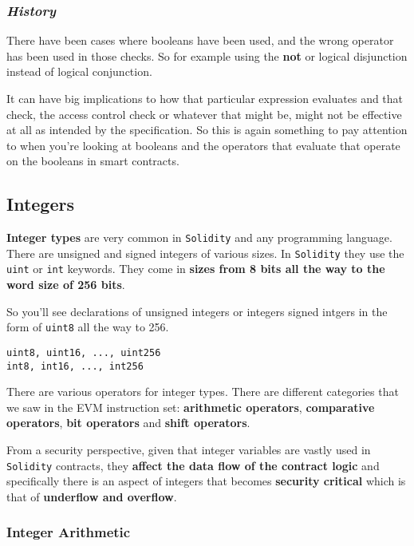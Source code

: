 \subsubsection{\texorpdfstring{\textbf{\emph{History}}}{History}}\label{history}

There have been cases where booleans have been used, and the wrong
operator has been used in those checks. So for example using the
\textbf{not} or logical disjunction instead of logical conjunction.

It can have big implications to how that particular expression evaluates
and that check, the access control check or whatever that might be,
might not be effective at all as intended by the specification. So this
is again something to pay attention to when you're looking at booleans
and the operators that evaluate that operate on the booleans in smart
contracts.

\subsection{Integers}\label{integers}

\textbf{Integer types} are very common in \texttt{Solidity} and any
programming language. There are unsigned and signed integers of various
sizes. In \texttt{Solidity} they use the \texttt{uint} or \texttt{int}
keywords. They come in \textbf{sizes from 8 bits all the way to the word
size of 256 bits}.

So you'll see declarations of unsigned integers or integers signed
intgers in the form of \texttt{uint8} all the way to 256.

\begin{lstlisting}[language=Solidity,numbers=none]
uint8, uint16, ..., uint256 
int8, int16, ..., int256
\end{lstlisting}

There are various operators for integer types. There are different
categories that we saw in the EVM instruction set: \textbf{arithmetic
operators}, \textbf{comparative operators}, \textbf{bit operators} and
\textbf{shift operators}.

From a security perspective, given that integer variables are vastly
used in \texttt{Solidity} contracts, they \textbf{affect the data flow
of the contract logic} and specifically there is an aspect of integers
that becomes \textbf{security critical} which is that of
\textbf{underflow and overflow}.

\subsubsection{Integer Arithmetic}\label{integer-arithmetic}

